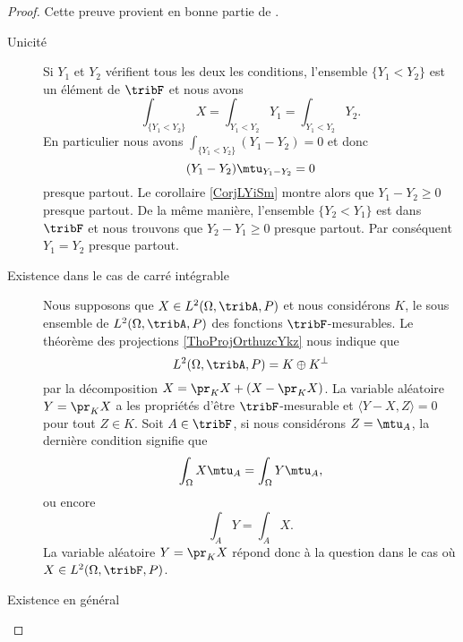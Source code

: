 \begin{proof}
    Cette preuve provient en bonne partie de \cite{ProbCOndutetz}.

    \begin{description}
        \item[Unicité] Si \( Y_1\) et \( Y_2\) vérifient tous les deux les conditions, l'ensemble \( \{ Y_1<Y_2 \}\) est un élément de \( \tribF\) et nous avons
            \begin{equation}
                \int_{\{ Y_1<Y_2 \}}X=\int_{Y_1<Y_2}Y_1=\int_{Y_1<Y_2}Y_2.
            \end{equation}
            En particulier nous avons \( \int_{\{ Y_1<Y_2 \}}(Y_1-Y_2)=0\) et donc
            \begin{equation}
                (Y_1-Y_2)\mtu_{Y_1-Y_2}=0
            \end{equation}
            presque partout. Le corollaire \ref{CorjLYiSm} montre alors que \( Y_1-Y_2\geq 0\) presque partout. De la même manière, l'ensemble \( \{ Y_2<Y_1 \}\) est dans \( \tribF\) et nous trouvons que \( Y_2-Y_1\geq 0\) presque partout. Par conséquent \( Y_1=Y_2\) presque partout.
        \item[Existence dans le cas de carré intégrable]

            Nous supposons que \( X\in L^2(\Omega,\tribA,P)\) et nous considérons \( K\), le sous ensemble de \( L^2(\Omega,\tribA,P)\) des fonctions \( \tribF\)-mesurables. Le théorème des projections \ref{ThoProjOrthuzcYkz} nous indique que
            \begin{equation}
                L^2(\Omega,\tribA,P)=K\oplus K^{\perp}
            \end{equation}
            par la décomposition \( X=\pr_{K}X+(X-\pr_KX)\). La variable aléatoire \( Y=\pr_KX\) a les propriétés d'être \( \tribF\)-mesurable et \( \langle Y-X, Z\rangle =0\) pour tout \( Z\in K\). Soit \( A\in\tribF\), si nous considérons \( Z=\mtu_A\), la dernière condition signifie que
            \begin{equation}
                \int_{\Omega}X\mtu_A=\int_{\Omega}Y\mtu_A,
            \end{equation}
            ou encore
            \begin{equation}
                \int_AY=\int_AX.
            \end{equation}
            La variable aléatoire \( Y=\pr_KX\) répond donc à la question dans le cas où \( X\in L^2(\Omega,\tribF,P)\).

        \item[Existence en général] 


\end{description}
\end{proof}
